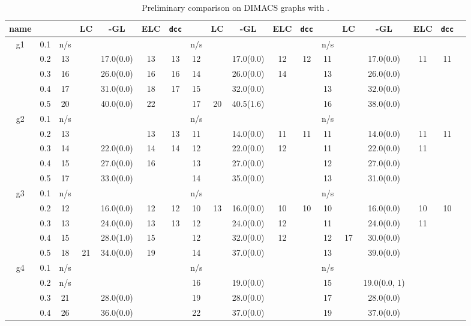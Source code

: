 \documentclass[10pt]{article}
\begin{document}
\begin{table}[H]
  \small
  \centering
    \caption{Preliminary comparison on DIMACS graphs with . }
  \begin{tabular}{|c|c|c|c|c|c|c||c|c|c|c|c||c|c|c|c|c|c|} \hline
	name &&& LC & -GL & ELC& \texttt{dcc} &  & LC & -GL & ELC & \texttt{dcc} & &LC&-GL&ELC&\texttt{dcc}\\ 
	\hline
	g1&0.1&n/s&  & & & &n/s&  &  &  &  & n/s&&&&\\ 
	\hline
	&0.2&13&  & 17.0(0.0) & 13& 13 &12 &  &17.0(0.0) & 12 & 12 & 11&&17.0(0.0)&11&11\\ 
	\hline
	&0.3&16& & 26.0(0.0) & 16& 16 &14 &  &26.0(0.0)& 14 &  & 13&&26.0(0.0)&&\\ 
	\hline
	&0.4&17&  & 31.0(0.0) & 18& 17 & 15 &  & 32.0(0.0) &  &  & 13&&32.0(0.0)&&\\ 
	\hline
	&0.5&20&  & 40.0(0.0) & 22&  & 17&20  & 40.5(1.6) &  &  & 16&&38.0(0.0)&&\\ 
	\hline
	g2&0.1&n/s&  & & & &n/s&  &  &  &  & n/s&&&&\\ 
	\hline
	&0.2&13&  & & 13& 13 &11 &  &14.0(0.0) & 11 & 11 & 11&&14.0(0.0)&11&11\\ 
	\hline
	&0.3&14& & 22.0(0.0) & 14& 14 &12 &  &22.0(0.0)& 12 &  & 11&&22.0(0.0)&11&\\ 
	\hline
	&0.4&15&  & 27.0(0.0) & 16&  & 13 &  & 27.0(0.0) &  &  & 12&&27.0(0.0)&&\\ 
	\hline
	&0.5&17&  & 33.0(0.0) & &  & 14&  & 35.0(0.0) &  &  & 13&&31.0(0.0)&&\\ 
	\hline
	g3&0.1&n/s&  & & & &n/s&  &  &  &  & n/s&&&&\\ 
	\hline
	&0.2&12&  & 16.0(0.0)& 12& 12 &10 & 13 &16.0(0.0) & 10 & 10 & 10&&16.0(0.0)&10&10\\ 
	\hline
	&0.3&13& & 24.0(0.0) & 13& 13 &12 &  &24.0(0.0)& 12 &  & 11&&24.0(0.0)&11&\\ 
	\hline
	&0.4&15&  & 28.0(1.0) & 15&  & 12 &  & 32.0(0.0) &12 &  & 12&17&30.0(0.0)&&\\ 
	\hline
	&0.5&18& 21 & 34.0(0.0) & 19&  & 14&  & 37.0(0.0) &  &  & 13&&39.0(0.0)&&\\ 
	\hline
	g4&0.1&n/s&  & & & &n/s&  &  &  &  & n/s&&&&\\ 
	\hline
	&0.2&n/s&  & & & &16 & &19.0(0.0) &  &  & 15&&19.0(0.0, 1\footnotemark)&&\\ 
	\hline
	&0.3&21& & 28.0(0.0) & &  &19 &  &28.0(0.0)&  &  & 17&&28.0(0.0)&&\\ 
	\hline
	&0.4&26&  & 36.0(0.0) & &  & 22 &  & 37.0(0.0) & &  & 19&&37.0(0.0)&&\\ 

\end{tabular}
\end{table}
\end{document}
